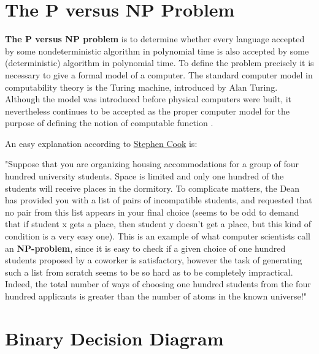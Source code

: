 \documentclass[12pt]{book}
\begin{document}
\section{The P versus NP Problem}
\label{sec:The P versus NP Problem}

\begin{defi}\label{def:np} 
      \textbf{The P versus NP problem} is to determine whether every language accepted by some nondeterministic algorithm in polynomial time is also accepted by some
      (deterministic) algorithm in polynomial time. To define the problem precisely it is necessary to give a formal model of a computer.
      The standard computer model in computability theory is the Turing machine, introduced by Alan Turing. Although the model was introduced before physical computers were built, it
      nevertheless continues to be accepted as the proper computer model for the purpose of defining the notion of computable function \cite{h4}.
\end{defi} 
An easy explanation according to \href{http://www.claymath.org/prizeproblems/pvsnp.htm}{Stephen Cook} is:

"Suppose that you are organizing housing accommodations for a group of four hundred university students. Space is limited and only one hundred of the students will receive places in the dormitory. 
To complicate matters, the Dean has provided you with a list of pairs of incompatible students, and requested that no pair from this list appears in your final choice (seems to be odd to demand 
that if student x gets a place, then student y doesn’t get a place, but this kind of condition is a very easy one). This is an example of what computer scientists call an \textbf{NP-problem}, 
since it is easy to check if a given choice of one hundred students proposed by a coworker is satisfactory, however the task of generating such a list from scratch seems to be so hard as to be 
completely impractical. Indeed, the total number of ways of choosing one hundred students from the four hundred applicants is greater than the number of atoms in the known universe!"
\section{Binary Decision Diagram}
\label{sec:Binary Decision Diagram}
\end{document}
